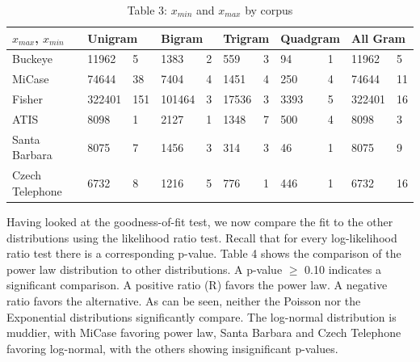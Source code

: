 \documentclass[12pt]{article}
\begin{document}
\begin{table}[H]
\caption{Table 3: $x_{min}$ and $x_{max}$ by corpus}
\begin{center}
\begin{tabular}{| *{11}{l|} }
    \hline
$x_{max}$, $x_{min}$    & \multicolumn{2}{l|}{Unigram}
            & \multicolumn{2}{l|}{Bigram}
                    & \multicolumn{2}{l|}{Trigram}
                            & \multicolumn{2}{l|}{Quadgram} 
                            & \multicolumn{2}{l|}{All Gram}\\
    \hline
Buckeye   &   11962  &   5  & 1383 & 2&   559  &   3  &   94  &   1  &   11962  &   5  \\
    \hline
MiCase   &   74644  &   38  &   7404  &   4  &   1451  &   4  &   250  &   4 & 74644 & 11  \\
    \hline
Fisher   &  322401 & 151 & 101464 & 3 & 17536 & 3 & 3393 & 5 & 322401 & 16\\
    \hline
ATIS   &  8098     &    1   &   2127    &   1    &      1348 &  7     &     500  &      4 & 8098 & 3 \\
    \hline
Santa Barbara   &  8075     &   7    &  1456     &      3 & 314& 3&  46      & 1      & 8075      &      9 \\    \hline
Czech Telephone   &   6732    &     8  &    1216   &    5   &  776     &     1  & 446       & 1     & 6732 & 16  \\
    \hline
\end{tabular}
\end{center}
\end{table}

Having looked at the goodness-of-fit test, we now compare the fit to the other distributions using the likelihood ratio test. Recall that for every log-likelihood ratio test there is a corresponding p-value.  Table 4 shows the comparison of the power law distribution to other distributions.  A p-value $\geq$ 0.10 indicates a significant comparison.  A positive ratio (R) favors the power law.  A negative ratio favors the alternative.  As can be seen, neither the Poisson nor the Exponential distributions significantly compare.  The log-normal distribution is muddier, with MiCase favoring power law, Santa Barbara and Czech Telephone favoring log-normal, with the others showing insignificant p-values.
\end{document}

